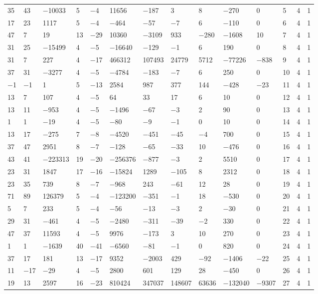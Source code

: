 \documentclass[10pt,a4paper]{amsart}
\numberwithin{equation}{section}
\theoremstyle{definition}
\numberwithin{table}{section}
\begin{document}
{\begin{paracol}{3}
\begin{supertabular}{|w{c}{.32cm}w{c}{.32cm}w{c}{.32cm}@{\hspace{.5cm}}w{c}{.2cm}w{c}{.2cm}|@{\hspace{\tabcolsep}}HHHHHHw{c}{.17cm}w{c}{.17cm}w{c}{.17cm}|}
			35 & 43 & $-$10033 & 5 & $-$4 & 11656 & $-$187 & 3 & 8 & $-$270 & 0 & 5 & 4 & 1 \\
			17 & 23 & 1117 & 5 & $-$4 & $-$464 & $-$57 & $-$7 & 6 & $-$110 & 0 & 6 & 4 & 1 \\
			47 & 7 & 19 & 13 & $-$29 & 10360 & $-$3109 & 933 & $-$280 & $-$1608 & 10 & 7 & 4 & 1 \\
			31 & 25 & $-$15499 & 4 & $-$5 & $-$16640 & $-$129 & $-$1 & 6 & 190 & 0 & 8 & 4 & 1 \\
			31 & 7 & 227 & 4 & $-$17 & 466312 & 107493 & 24779 & 5712 & $-$77226 & $-$838 & 9 & 4 & 1 \\
			37 & 31 & $-$3277 & 4 & $-$5 & $-$4784 & $-$183 & $-$7 & 6 & 250 & 0 & 10 & 4 & 1 \\
			$-$1 & $-$1 & 1 & 5 & $-$13 & 2584 & 987 & 377 & 144 & $-$428 & $-$23 & 11 & 4 & 1 \\
			13 & 7 & 107 & 4 & $-$5 & 64 & 33 & 17 & 6 & 10 & 0 & 12 & 4 & 1 \\
			13 & 11 & $-$953 & 4 & $-$5 & $-$1496 & $-$67 & $-$3 & 2 & 90 & 0 & 13 & 4 & 1 \\
			1 & 1 & $-$19 & 4 & $-$5 & $-$80 & $-$9 & $-$1 & 0 & 10 & 0 & 14 & 4 & 1 \\
			13 & 17 & $-$275 & 7 & $-$8 & $-$4520 & $-$451 & $-$45 & $-$4 & 700 & 0 & 15 & 4 & 1 \\
			37 & 47 & 2951 & 8 & $-$7 & $-$128 & $-$65 & $-$33 & 10 & $-$476 & 0 & 16 & 4 & 1 \\
			43 & 41 & $-$223313 & 19 & $-$20 & $-$256376 & $-$877 & $-$3 & 2 & 5510 & 0 & 17 & 4 & 1 \\
			23 & 31 & 1847 & 17 & $-$16 & $-$15824 & 1289 & $-$105 & 8 & 2312 & 0 & 18 & 4 & 1 \\
			23 & 35 & 739 & 8 & $-$7 & $-$968 & 243 & $-$61 & 12 & 28 & 0 & 19 & 4 & 1 \\
			71 & 89 & 126379 & 5 & $-$4 & $-$123200 & $-$351 & $-$1 & 18 & $-$530 & 0 & 20 & 4 & 1 \\
			5 & 7 & 233 & 5 & $-$4 & $-$56 & $-$13 & $-$3 & 2 & $-$30 & 0 & 21 & 4 & 1 \\
			29 & 31 & $-$461 & 4 & $-$5 & $-$2480 & $-$311 & $-$39 & $-$2 & 330 & 0 & 22 & 4 & 1 \\
			47 & 37 & 11593 & 4 & $-$5 & 9976 & $-$173 & 3 & 10 & 270 & 0 & 23 & 4 & 1 \\
			1 & 1 & $-$1639 & 40 & $-$41 & $-$6560 & $-$81 & $-$1 & 0 & 820 & 0 & 24 & 4 & 1 \\
			37 & 17 & 181 & 13 & $-$17 & 9352 & $-$2003 & 429 & $-$92 & $-$1406 & $-$22 & 25 & 4 & 1 \\
			11 & $-$17 & $-$29 & 4 & $-$5 & 2800 & 601 & 129 & 28 & $-$450 & 0 & 26 & 4 & 1 \\
			19 & 13 & 2597 & 16 & $-$23 & 810424 & 347037 & 148607 & 63636 & $-$132040 & $-$9307 & 27 & 4 & 1 \\\hline
		\end{supertabular}
		

\end{paracol}}
\end{document}
